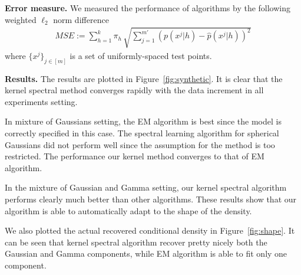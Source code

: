 \documentclass{article}
\begin{document}
{\bf Error measure.} We measured the performance of algorithms by the
following weighted $\ell_2$ norm difference
\begin{align*}
  MSE:=\sum_{h=1}^{k} \pi_h\, \sqrt{\sum_{j=1}^{m'} (p(x^j|h) - \widehat{p}(x^j|h))^2 }
\end{align*}
where $\{x^j\}_{j\in[m]}$ is a set of uniformly-spaced test points.

{\bf Results.} The results are plotted in Figure~\ref{fig:synthetic}. It is clear that the kernel spectral method converges rapidly with the data increment in all experiments setting.

In mixture of Gaussians setting, the EM algorithm is best since the model is correctly specified in this case. The spectral learning algorithm for spherical Gaussians did not perform well since the assumption for the method is too restricted. The performance our kernel method converges to that of EM algorithm.

In the mixture of Gaussian and Gamma setting, our kernel spectral algorithm performs clearly much better than other algorithms. These results show that our algorithm is able to automatically adapt to the shape of the density.

We also plotted the actual recovered conditional density in Figure~\ref{fig:shape}. It can be seen that kernel spectral algorithm recover pretty nicely both the Gaussian and Gamma components, while EM algorithm is able to fit only one component.
\end{document}
